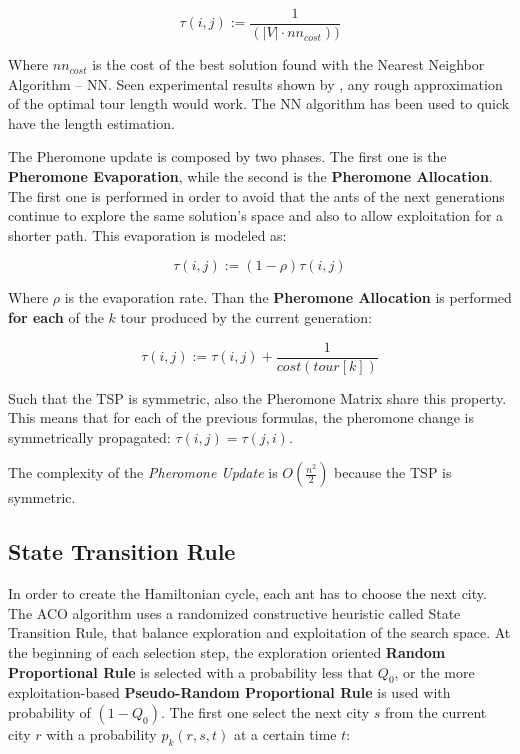 \documentclass[a4paper,9pt,journal,twoside,compsoc]{PPIEEEtran}
\begin{document}
\begin{equation}
\tau(i, j) := \frac{1}{(|V| \cdot nn_{cost}))}
\end{equation}

Where $nn_{cost}$ is the cost of the best solution found with the Nearest Neighbor Algorithm -- NN. Seen experimental results shown by \cite{izzo}, any rough approximation of the optimal tour length would work. The NN algorithm has been used to quick have the length estimation.

The Pheromone update is composed by two phases. The first one is the \textbf{Pheromone Evaporation}, while the second is the \textbf{Pheromone Allocation}. The first one is performed in order to avoid that the ants of the next generations continue to explore the same solution's space and also to allow exploitation for a shorter path. This evaporation is modeled as:

\begin{equation}
\tau(i, j) := (1 - \rho) \tau(i, j)
\end{equation}

Where $\rho$ is the evaporation rate. Than the \textbf{Pheromone Allocation} is performed \textbf{for each} of the $k$ tour produced by the current generation:

\begin{equation}
\tau(i, j) := \tau(i, j) + \frac{1}{cost(tour[k])}
\end{equation}


Such that the TSP is symmetric, also the Pheromone Matrix share this property. This means that for each of the previous formulas, the pheromone change is symmetrically propagated: $\tau(i, j) = \tau(j, i)$.

The complexity of the \textit{Pheromone Update} is $ O( \frac{n^2}{2} ) $ because the TSP is symmetric.


\subsection{State Transition Rule}
In order to create the Hamiltonian cycle, each ant has to choose the next city. The ACO algorithm uses a randomized constructive heuristic called State Transition Rule, that balance exploration and exploitation of the search space. At the beginning of each selection step, the exploration oriented \textbf{Random Proportional Rule} is selected with a probability less that $Q_0$, or the more exploitation-based \textbf{Pseudo-Random Proportional Rule} is used with probability of $(1-Q_0)$. The first one select the next city $s$ from the current city $r$ with a probability $p_k(r,s,t)$ at a certain time $t$:
\end{document}
